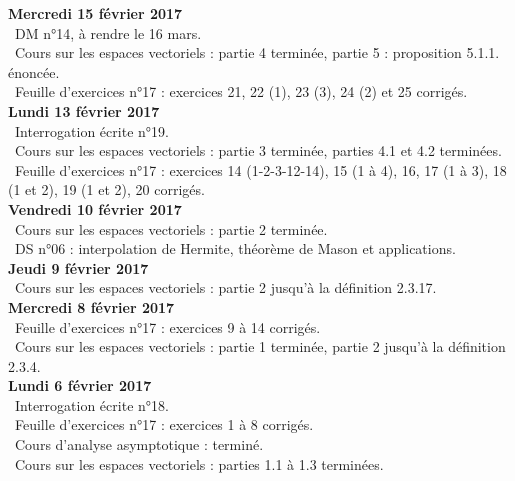 \documentclass[12pt,a4paper]{article}
\begin{document}
\noindent\textbf{Mercredi 15 février 2017}\\
\bu\ DM n°14, à rendre le 16 mars.\\
\bu\ Cours sur les espaces vectoriels : partie 4 terminée, partie 5 : proposition 5.1.1. énoncée.\\
\bu\ Feuille d'exercices n°17 : exercices 21, 22 (1), 23 (3), 24 (2) et 25 corrigés.\vspace{.4cm}\\

\noindent\textbf{Lundi 13 février 2017}\\
\bu\ Interrogation écrite n°19.\\
\bu\ Cours sur les espaces vectoriels : partie 3 terminée, parties 4.1 et 4.2 terminées.\\
\bu\ Feuille d'exercices n°17 : exercices 14 (1-2-3-12-14), 15 (1 à 4), 16, 17 (1 à 3), 18 (1 et 2), 19 (1 et 2), 20 corrigés.\vspace{.4cm}\\

\noindent\textbf{Vendredi 10 février 2017}\\
\bu\ Cours sur les espaces vectoriels : partie 2 terminée.\\
\bu\ DS n°06 : interpolation de Hermite, théorème de Mason et applications.\vspace{.4cm}\\

\noindent\textbf{Jeudi 9 février 2017}\\
\bu\ Cours sur les espaces vectoriels : partie 2 jusqu'à la définition 2.3.17.\vspace{.4cm}\\

\noindent\textbf{Mercredi 8 février 2017}\\
\bu\ Feuille d'exercices n°17 : exercices 9 à 14 corrigés.\\
\bu\ Cours sur les espaces vectoriels : partie 1 terminée, partie 2 jusqu'à la définition 2.3.4.\vspace{.4cm}\\

\noindent\textbf{Lundi 6 février 2017}\\
\bu\ Interrogation écrite n°18.\\
\bu\ Feuille d'exercices n°17 : exercices 1 à 8 corrigés.\\
\bu\ Cours d'analyse asymptotique : terminé.\\
\bu\ Cours sur les espaces vectoriels : parties 1.1 à 1.3 terminées.\vspace{.4cm}\\
\end{document}
